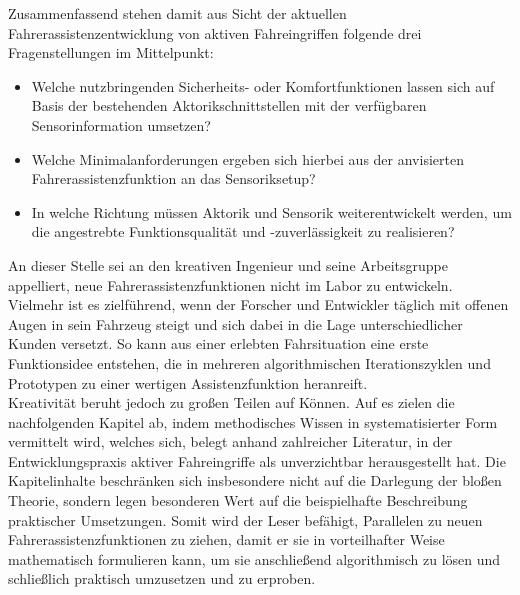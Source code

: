 Zusammenfassend stehen damit aus Sicht der aktuellen Fahrerassistenzentwicklung von aktiven Fahreingriffen folgende drei Fragenstellungen im Mittelpunkt: 
\begin{itemize}
\item Welche nutzbringenden Sicherheits- oder Komfortfunktionen lassen sich auf Basis der bestehenden Aktorikschnittstellen mit der verfügbaren Sensorinformation umsetzen?
\item Welche Minimalanforderungen ergeben sich hierbei aus der anvisierten Fahrerassistenzfunktion an das Sensoriksetup?
\item In welche Richtung müssen Aktorik und Sensorik weiterentwickelt werden, um die angestrebte Funktionsqualität und -zuverlässigkeit zu realisieren?
\end{itemize}
An dieser Stelle sei an den kreativen Ingenieur und seine Arbeitsgruppe appelliert, neue Fahrerassistenzfunktionen nicht im Labor zu entwickeln. Vielmehr ist es zielführend, wenn der Forscher und Entwickler täglich mit offenen Augen in sein Fahrzeug steigt und sich dabei in die Lage unterschiedlicher Kunden versetzt. So kann aus einer erlebten Fahrsituation eine erste Funktionsidee entstehen, die in mehreren algorithmischen Iterationszyklen und Prototypen zu einer wertigen Assistenzfunktion heranreift. \\
Kreativität beruht jedoch zu großen Teilen auf Können. Auf es zielen die nachfolgenden Kapitel ab, indem methodisches Wissen in systematisierter Form vermittelt wird, welches sich, belegt anhand zahlreicher Literatur, in der Entwicklungspraxis aktiver Fahreingriffe als unverzichtbar herausgestellt hat. Die Kapitelinhalte beschränken sich insbesondere nicht auf die Darlegung der bloßen Theorie, sondern legen besonderen Wert auf die beispielhafte Beschreibung praktischer Umsetzungen. Somit wird der Leser befähigt, Parallelen zu neuen Fahrerassistenzfunktionen zu ziehen, damit er sie in vorteilhafter Weise mathematisch formulieren kann, um sie anschließend algorithmisch zu lösen und schließlich praktisch umzusetzen und zu erproben.

\cleardoublepage



